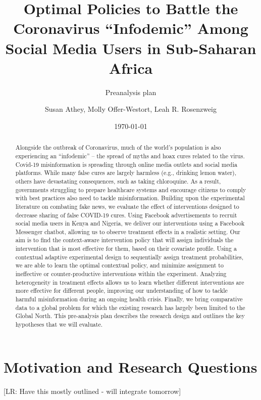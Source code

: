 \documentclass[letterpaper, 12pt, parskip=full, headsepline]{scrartcl}
\title{Optimal Policies to Battle the Coronavirus ``Infodemic'' Among Social Media Users in Sub-Saharan Africa}
\subtitle{Preanalysis plan}
\author{Susan Athey, Molly Offer-Westort, Leah R. Rosenzweig}
\date{\today}
\begin{document}
%
\normalsize%
\maketitle%
\tableofcontents%
\clearpage%


\begin{abstract}
Alongside the outbreak of Coronavirus, much of the world’s population is also experiencing an “infodemic” -- the spread of myths and hoax cures related to the virus. Covid-19 misinformation is spreading through online media outlets and social media platforms. While many false cures are largely harmless (e.g., drinking lemon water), others have devastating consequences, such as taking chloroquine. As a result, governments struggling to prepare healthcare systems and encourage citizens to comply with best practices also need to tackle misinformation. Building upon the experimental literature on combating fake news, we evaluate the effect of interventions designed to decrease sharing of false COVID-19 cures. Using Facebook advertisements to recruit social media users in Kenya and Nigeria, we deliver our interventions using a Facebook Messenger chatbot, allowing us to observe treatment effects in a realistic setting. Our aim is to find the context-aware intervention policy that will assign individuals the intervention that is most effective for them, based on their covariate profile. Using a contextual adaptive experimental design to sequentially assign treatment probabilities, we are able to learn the optimal contextual policy, and minimize assignment to ineffective or counter-productive interventions within the experiment. Analyzing heterogeneity in treatment effects allows us to learn whether different interventions are more effective for different people, improving our understanding of how to tackle harmful misinformation during an ongoing health crisis. Finally, we bring comparative data to a global problem for which the existing research has largely been limited to the Global North. This pre-analysis plan describes the research design and outlines the key hypotheses that we will evaluate.
\end{abstract}




\clearpage



\clearpage
\appendix

\section{Motivation and Research Questions}
[LR: Have this mostly outlined - will integrate tomorrow]
\end{document}
